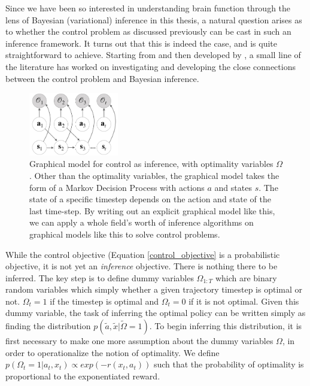 Since we have been so interested in understanding brain function through the lens of Bayesian (variational) inference in this thesis, a natural question arises as to whether the control problem as discussed previously can be cast in such an inference framework. It turns out that this is indeed the case, and is quite straightforward to achieve. Starting from \citep{attias2003planning} and then developed by \citep{toussaint2006probabilistic,todorov2008general,rawlik2013probabilistic,kappen2012optimal,theodorou2010generalized,levine2018reinforcement}, a small line of the literature has worked on investigating and developing the close connections between the control problem and Bayesian inference.
\begin{figure}
    \begin{center}
          \includegraphics[width=0.35\textwidth]{chapter_4_figures/pgm.pdf}
    \end{center}
    \caption{Graphical model for control as inference, with optimality variables $\Omega$. Other than the optimality variables, the graphical model takes the form of a Markov Decision Process with actions $a$ and states $s$. The state of a specific timestep depends on the action and state of the last time-step. By writing out an explicit graphical model like this, we can apply a whole field's worth of inference algorithms on graphical models like this to solve control problems.}
\label{fig:graphical-model}
\end{figure}

While the control objective (Equation \ref{control_objective} is a probabilistic objective, it is not yet an \emph{inference} objective. There is nothing there to be inferred. The key step is to define dummy variables $\Omega_{1:T}$ which are binary random variables which simply whether a given trajectory timestep is optimal or not. $\Omega_t = 1$ if the timestep is optimal and $\Omega_t = 0$ if it is not optimal. Given this dummy variable, the task of inferring the optimal policy can be written simply as finding the distribution $p(\tilde{a}, \tilde{x} | \tilde{\Omega} = 1)$. To begin inferring this distribution, it is first necessary to make one more assumption about the dummy variables $\Omega$, in order to operationalize the notion of optimality. We define $p(\Omega_t = 1 | a_t, x_t) \propto exp(-r(x_t, a_t))$ such that the probability of optimality is proportional to the exponentiated reward. 

